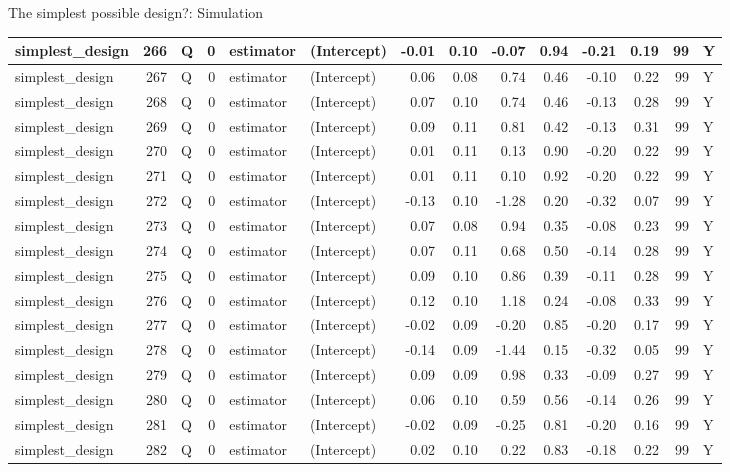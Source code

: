 \documentclass[
  11pt,
  ignorenonframetext,
]{beamer}
\begin{document}
\begin{frame}[fragile]{The simplest possible design?: Simulation}
\begin{tabular}{l|r|l|r|l|l|r|r|r|r|r|r|r|l}
\hline
simplest\_design & 266 & Q & 0 & estimator & (Intercept) & -0.01 & 0.10 & -0.07 & 0.94 & -0.21 & 0.19 & 99 & Y\\
\hline
simplest\_design & 267 & Q & 0 & estimator & (Intercept) & 0.06 & 0.08 & 0.74 & 0.46 & -0.10 & 0.22 & 99 & Y\\
\hline
simplest\_design & 268 & Q & 0 & estimator & (Intercept) & 0.07 & 0.10 & 0.74 & 0.46 & -0.13 & 0.28 & 99 & Y\\
\hline
simplest\_design & 269 & Q & 0 & estimator & (Intercept) & 0.09 & 0.11 & 0.81 & 0.42 & -0.13 & 0.31 & 99 & Y\\
\hline
simplest\_design & 270 & Q & 0 & estimator & (Intercept) & 0.01 & 0.11 & 0.13 & 0.90 & -0.20 & 0.22 & 99 & Y\\
\hline
simplest\_design & 271 & Q & 0 & estimator & (Intercept) & 0.01 & 0.11 & 0.10 & 0.92 & -0.20 & 0.22 & 99 & Y\\
\hline
simplest\_design & 272 & Q & 0 & estimator & (Intercept) & -0.13 & 0.10 & -1.28 & 0.20 & -0.32 & 0.07 & 99 & Y\\
\hline
simplest\_design & 273 & Q & 0 & estimator & (Intercept) & 0.07 & 0.08 & 0.94 & 0.35 & -0.08 & 0.23 & 99 & Y\\
\hline
simplest\_design & 274 & Q & 0 & estimator & (Intercept) & 0.07 & 0.11 & 0.68 & 0.50 & -0.14 & 0.28 & 99 & Y\\
\hline
simplest\_design & 275 & Q & 0 & estimator & (Intercept) & 0.09 & 0.10 & 0.86 & 0.39 & -0.11 & 0.28 & 99 & Y\\
\hline
simplest\_design & 276 & Q & 0 & estimator & (Intercept) & 0.12 & 0.10 & 1.18 & 0.24 & -0.08 & 0.33 & 99 & Y\\
\hline
simplest\_design & 277 & Q & 0 & estimator & (Intercept) & -0.02 & 0.09 & -0.20 & 0.85 & -0.20 & 0.17 & 99 & Y\\
\hline
simplest\_design & 278 & Q & 0 & estimator & (Intercept) & -0.14 & 0.09 & -1.44 & 0.15 & -0.32 & 0.05 & 99 & Y\\
\hline
simplest\_design & 279 & Q & 0 & estimator & (Intercept) & 0.09 & 0.09 & 0.98 & 0.33 & -0.09 & 0.27 & 99 & Y\\
\hline
simplest\_design & 280 & Q & 0 & estimator & (Intercept) & 0.06 & 0.10 & 0.59 & 0.56 & -0.14 & 0.26 & 99 & Y\\
\hline
simplest\_design & 281 & Q & 0 & estimator & (Intercept) & -0.02 & 0.09 & -0.25 & 0.81 & -0.20 & 0.16 & 99 & Y\\
\hline
simplest\_design & 282 & Q & 0 & estimator & (Intercept) & 0.02 & 0.10 & 0.22 & 0.83 & -0.18 & 0.22 & 99 & Y\\

\end{tabular}
\end{frame}
\end{document}
